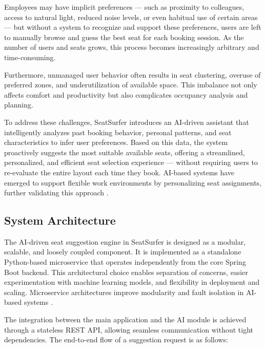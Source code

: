 \documentclass[12pt,a4paper]{report} %
\begin{document}
Employees may have implicit preferences — such as proximity to colleagues, access to natural light, reduced noise levels, or even habitual use of certain areas — but without a system to recognize and support these preferences, users are left to manually browse and guess the best seat for each booking session. As the number of users and seats grows, this process becomes increasingly arbitrary and time-consuming.

Furthermore, unmanaged user behavior often results in seat clustering, overuse of preferred zones, and underutilization of available space. This imbalance not only affects comfort and productivity but also complicates occupancy analysis and planning.

To address these challenges, SeatSurfer introduces an AI-driven assistant that intelligently analyzes past booking behavior, personal patterns, and seat characteristics to infer user preferences. Based on this data, the system proactively suggests the most suitable available seats, offering a streamlined, personalized, and efficient seat selection experience — without requiring users to re-evaluate the entire layout each time they book. AI-based systems have emerged to support flexible work environments by personalizing seat assignments, further validating this approach \cite{lu2022ai}.

\subsection{System Architecture}

The AI-driven seat suggestion engine in SeatSurfer is designed as a modular, scalable, and loosely coupled component. It is implemented as a standalone Python-based microservice that operates independently from the core Spring Boot backend. This architectural choice enables separation of concerns, easier experimentation with machine learning models, and flexibility in deployment and scaling. Microservice architectures improve modularity and fault isolation in AI-based systems \cite{torres2023micro}.

The integration between the main application and the AI module is achieved through a stateless REST API, allowing seamless communication without tight dependencies. The end-to-end flow of a suggestion request is as follows:
\end{document}
